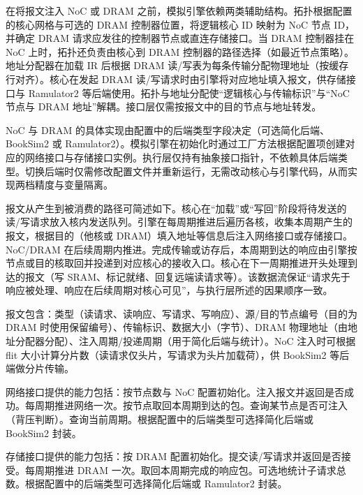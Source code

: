 在将报文注入 NoC 或 DRAM 之前，模拟引擎依赖两类辅助结构。拓扑根据配置的核心网格与可选的 DRAM 控制器位置，将逻辑核心 ID 映射为 NoC 节点 ID，并确定 DRAM 请求应发往的控制器节点或直连存储接口。当 DRAM 控制器挂在 NoC 上时，拓扑还负责由核心到 DRAM 控制器的路径选择（如最近节点策略）。地址分配器在加载 IR 后根据 DRAM 读/写表为每条传输分配物理地址（按缓存行对齐）。核心在发起 DRAM 读/写请求时由引擎将对应地址填入报文，供存储接口与 Ramulator2 等后端使用。拓扑与地址分配使“逻辑核心与传输标识”与“NoC 节点与 DRAM 地址”解耦。接口层仅需按报文中的目的节点与地址转发。


NoC 与 DRAM 的具体实现由配置中的后端类型字段决定（可选简化后端、BookSim2 或 Ramulator2）。模拟引擎在初始化时通过工厂方法根据配置项创建对应的网络接口与存储接口实例。执行层仅持有抽象接口指针，不依赖具体后端类型。切换后端时仅需修改配置文件并重新运行，无需改动核心与引擎代码，从而实现两档精度与变量隔离。

报文从产生到被消费的路径可简述如下。核心在“加载”或“写回”阶段将待发送的读/写请求放入核内发送队列。引擎在每周期推进后遍历各核，收集本周期产生的报文，根据目的（他核或 DRAM）填入地址等信息后注入网络接口或存储接口。NoC/DRAM 在后续周期内推进。完成传输或访存后，本周期到达的响应由引擎按节点或目的核取回并投递到对应核心的接收入口。核心在下一周期推进开头处理到达的报文（写 SRAM、标记就绪、回复远端读请求等）。该数据流保证“请求先于响应被处理、响应在后续周期对核心可见”，与执行层所述的因果顺序一致。


报文包含：类型（读请求、读响应、写请求、写响应）、源/目的节点编号（目的为 DRAM 时使用保留编号）、传输标识、数据大小（字节）、DRAM 物理地址（由地址分配器分配）、注入周期/投递周期（用于简化后端与统计）。NoC 注入时可根据 flit 大小计算分片数（读请求仅头片，写请求为头片加载荷），供 BookSim2 等后端做分片传输。

网络接口提供的能力包括：按节点数与 NoC 配置初始化。注入报文并返回是否成功。每周期推进网络一次。按节点取回本周期到达的包。查询某节点是否可注入（背压判断）。查询当前周期。根据配置中的后端类型可选择简化后端或 BookSim2 封装。

存储接口提供的能力包括：按 DRAM 配置初始化。提交读/写请求并返回是否接受。每周期推进 DRAM 一次。取回本周期完成的响应包。可选地统计子请求总数。根据配置中的后端类型可选择简化后端或 Ramulator2 封装。


